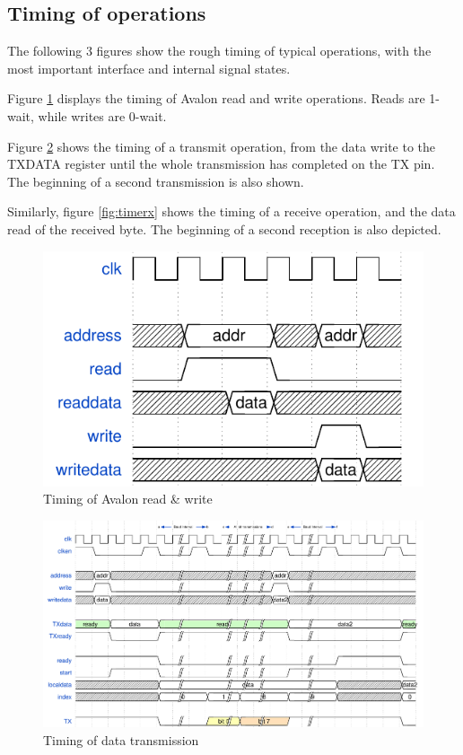 \documentclass[12pt,a4paper]{article}
\begin{document}
\subsection{Timing of operations}

The following 3 figures show the rough timing of typical operations, with the most important interface and internal signal states. 

Figure \ref{fig:timerw} displays the timing of Avalon read and write operations. Reads are 1-wait, while writes are 0-wait.

Figure \ref{fig:timetx} shows the timing of a transmit operation, from the data write to the TXDATA register until the whole transmission has completed on the TX pin. The beginning of a second transmission is also shown.

Similarly, figure \ref{fig:timerx} shows the timing of a receive operation, and the data read of the received byte. The beginning of a second reception is also depicted.

\begin{figure}[h]
	\centering
	\includegraphics[width=.5\textwidth]{timings/read_write_ctrl}
	\caption{Timing of Avalon read \& write}
	\label{fig:timerw}
\end{figure}

\begin{figure}[h]
	\centering
	\includegraphics[width=\textwidth]{timings/TX}
	\caption{Timing of data transmission}
	\label{fig:timetx}
\end{figure}
\end{document}
